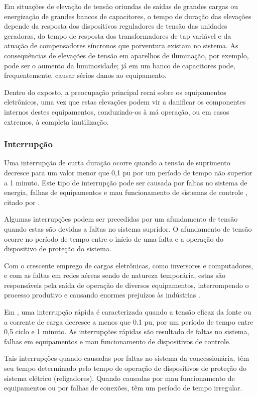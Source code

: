 Em situações de elevação de tensão oriundas de saídas de grandes cargas ou energização de grandes bancos de capacitores, o tempo de duração das elevações depende da resposta dos dispositivos reguladores de tensão das unidades geradoras, do tempo de resposta dos transformadores de tap variável e da atuação de compensadores síncronos que porventura existam no sistema. As consequências de elevações de tensão em aparelhos de iluminação, por exemplo, pode ser o aumento da luminosidade; já em um banco de capacitores pode, frequentemente, causar sérios danos ao equipamento.
\par
Dentro do exposto, a preocupação principal recai sobre os equipamentos eletrônicos, uma vez que estas elevações podem vir a danificar os componentes internos destes equipamentos, conduzindo-os à má operação, ou em casos extremos, à completa inutilização.

\subsubsection{Interrupção}
\par
Uma interrupção de curta duração ocorre quando a tensão de suprimento decresce para um valor menor que 0,1 pu por um período de tempo não superior a 1 minuto. Este tipo de interrupção pode ser causada por faltas no sistema de energia, falhas de equipamentos e mau funcionamento de sistemas de controle \citep{OLIVE}, citado por \citep{DEL03}.
\par
Algumas interrupções podem ser precedidas por um afundamento de tensão quando estas são devidas a faltas no sistema supridor. O afundamento de tensão ocorre no período de tempo entre o início de uma falta e a operação do dispositivo de proteção do sistema.
\par
Com o crescente emprego de cargas eletrônicas, como inversores e computadores, e com as faltas em redes aéreas sendo de natureza temporária, estas são responsáveis pela saída de operação de diversos equipamentos, interrompendo o processo produtivo e causando enormes prejuízos às indústrias \citep{DEL03}.
\par
Em \cite{FER99}, uma interrupção rápida é caracterizada quando a tensão eficaz da fonte ou a corrente de carga decresce a menos que 0.1 pu, por um período de tempo entre 0,5 ciclo e 1 minuto. As interrupções rápidas são resultado de faltas no sistema, falhas em equipamentos e mau funcionamento de dispositivos de controle.
\par
Tais interrupções quando causadas por faltas no sistema da concessionária, têm seu tempo determinado pelo tempo de operação de dispositivos de proteção do sistema elétrico (religadores). Quando causadas por mau funcionamento de equipamentos ou por falhas de conexões, têm um período de tempo irregular.

